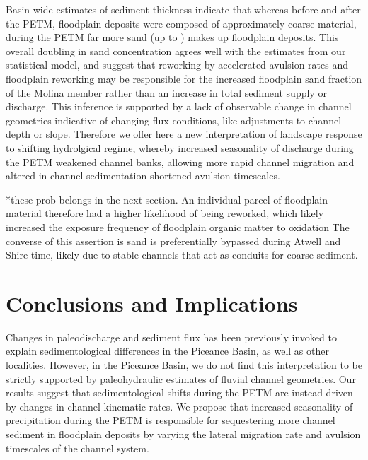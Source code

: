 \documentclass[draft]{compact_proposal}\usepackage[]{graphicx}\usepackage[]{color}
\begin{document}
Basin-wide estimates of sediment thickness indicate that whereas before and after the PETM, floodplain deposits were composed of approximately  coarse material, during the PETM far more sand (up to ) makes up floodplain deposits.
This overall doubling in sand concentration agrees well with the estimates from our statistical model, and suggest that reworking by accelerated avulsion rates and floodplain reworking may be responsible for the increased floodplain sand fraction of the Molina member rather than an increase in total sediment supply or discharge.
This inference is supported by a lack of observable change in channel geometries indicative of changing flux conditions, like adjustments to channel depth or slope.
Therefore we offer here a new interpretation of landscape response to shifting hydrolgical regime, whereby increased seasonality of discharge during the PETM weakened channel banks, allowing more rapid channel migration and altered in-channel sedimentation shortened avulsion timescales.

% 
% 
% 
% 





*these prob belongs in the next section.
  An individual parcel of floodplain material therefore had a higher likelihood of being reworked, which likely increased the exposure frequency of floodplain organic matter to oxidation
  The converse of this assertion is sand is preferentially bypassed during Atwell and Shire time, likely due to stable channels that act as conduits for coarse sediment.

\section{Conclusions and Implications}

Changes in paleodischarge and sediment flux has been previously invoked to explain sedimentological differences in the Piceance Basin, as well as other localities.
However, in the Piceance Basin, we do not find this interpretation to be strictly supported by paleohydraulic estimates of fluvial channel geometries.
Our results suggest that sedimentological shifts during the PETM are instead driven by changes in channel kinematic rates.
We propose that increased seasonality of precipitation during the PETM is responsible for sequestering more channel sediment in floodplain deposits by varying the lateral migration rate and avulsion timescales of the channel system.
\end{document}
